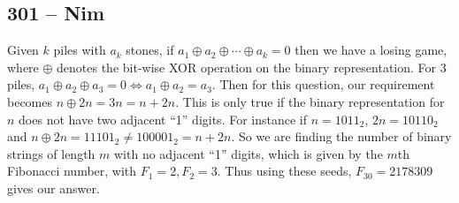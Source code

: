 \documentclass{article}
\begin{document}
\subsection*{301 -- Nim}
Given $k$ piles with $a_k$ stones, if $a_1 \oplus a_2 \oplus \dotsb \oplus a_k = 0$ then we have a losing game, where $\oplus$ denotes the bit-wise XOR operation on the binary representation.
For 3 piles, $a_1 \oplus a_2 \oplus a_3 = 0 \iff a_1 \oplus a_2 = a_3$.
Then for this question, our requirement becomes $n \oplus 2n = 3n = n + 2n$.
This is only true if the binary representation for $n$ does not have two adjacent ``1'' digits.
For instance if $n = 1011_2$, $2n = 10110_2$ and $n \oplus 2n = 11101_2 \neq 100001_2 = n+2n$.
So we are finding the number of binary strings of length $m$ with no adjacent ``1'' digits, which is given by the $m$th Fibonacci number, with $F_1 = 2, F_2 = 3$.
Thus using these seeds, $F_{30} = \boxed{2178309}$ gives our answer.
\end{document}
